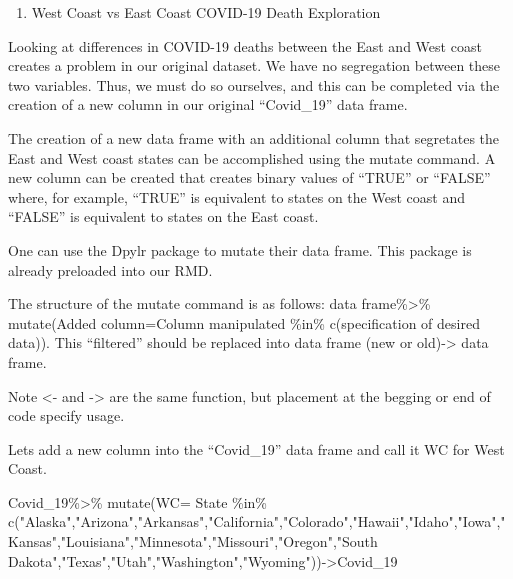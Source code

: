 \documentclass[
]{article}
\newenvironment{Shaded}{\begin{snugshade}}{\end{snugshade}}
\newcommand{\AttributeTok}[1]{\textcolor[rgb]{0.77,0.63,0.00}{#1}}
\newcommand{\FunctionTok}[1]{\textcolor[rgb]{0.00,0.00,0.00}{#1}}
\newcommand{\NormalTok}[1]{#1}
\newcommand{\OtherTok}[1]{\textcolor[rgb]{0.56,0.35,0.01}{#1}}
\newcommand{\SpecialCharTok}[1]{\textcolor[rgb]{0.00,0.00,0.00}{#1}}
\newcommand{\StringTok}[1]{\textcolor[rgb]{0.31,0.60,0.02}{#1}}
\providecommand{\tightlist}{%
  \setlength{\itemsep}{0pt}\setlength{\parskip}{0pt}}
\begin{document}
\begin{enumerate}
\def\labelenumi{\arabic{enumi}.}
\setcounter{enumi}{3}
\tightlist
\item
  West Coast vs East Coast COVID-19 Death Exploration
\end{enumerate}

Looking at differences in COVID-19 deaths between the East and West
coast creates a problem in our original dataset. We have no segregation
between these two variables. Thus, we must do so ourselves, and this can
be completed via the creation of a new column in our original
``Covid\_19'' data frame.

The creation of a new data frame with an additional column that
segretates the East and West coast states can be accomplished using the
mutate command. A new column can be created that creates binary values
of ``TRUE'' or ``FALSE'' where, for example, ``TRUE'' is equivalent to
states on the West coast and ``FALSE'' is equivalent to states on the
East coast.

One can use the Dpylr package to mutate their data frame. This package
is already preloaded into our RMD.

The structure of the mutate command is as follows: data
frame\%\textgreater\% mutate(Added column=Column manipulated \%in\%
c(specification of desired data)). This ``filtered'' should be replaced
into data frame (new or old)-\textgreater{} data frame.

Note \textless- and -\textgreater{} are the same function, but placement
at the begging or end of code specify usage.

Lets add a new column into the ``Covid\_19'' data frame and call it WC
for West Coast.

\begin{Shaded}
\begin{Highlighting}[]
\NormalTok{Covid\_19}\SpecialCharTok{\%\textgreater{}\%}
  \FunctionTok{mutate}\NormalTok{(}\AttributeTok{WC=}\NormalTok{ State }\SpecialCharTok{\%in\%} \FunctionTok{c}\NormalTok{(}\StringTok{"Alaska"}\NormalTok{,}\StringTok{"Arizona"}\NormalTok{,}\StringTok{"Arkansas"}\NormalTok{,}\StringTok{"California"}\NormalTok{,}\StringTok{"Colorado"}\NormalTok{,}\StringTok{"Hawaii"}\NormalTok{,}\StringTok{"Idaho"}\NormalTok{,}\StringTok{"Iowa"}\NormalTok{,}\StringTok{"Kansas"}\NormalTok{,}\StringTok{"Louisiana"}\NormalTok{,}\StringTok{"Minnesota"}\NormalTok{,}\StringTok{"Missouri"}\NormalTok{,}\StringTok{"Oregon"}\NormalTok{,}\StringTok{"South Dakota"}\NormalTok{,}\StringTok{"Texas"}\NormalTok{,}\StringTok{"Utah"}\NormalTok{,}\StringTok{"Washington"}\NormalTok{,}\StringTok{"Wyoming"}\NormalTok{))}\OtherTok{{-}\textgreater{}}\NormalTok{Covid\_19}
\end{Highlighting}
\end{Shaded}
\end{document}
